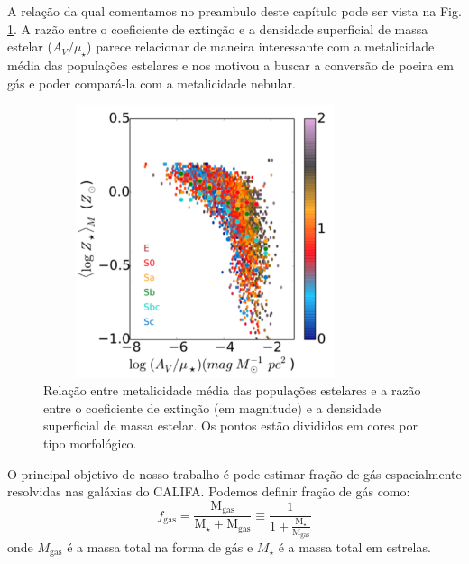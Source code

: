 A relação da qual comentamos no preambulo deste capítulo pode ser vista na Fig.
\ref{fig:dust2stars}. A razão entre o coeficiente de extinção e a densidade superficial de massa
estelar ($A_V / \mu_\star$) parece relacionar de maneira interessante com a metalicidade média das
populações estelares e nos motivou a buscar a conversão de poeira em gás e poder compará-la com a
metalicidade nebular.
\begin{figure}
	\centering
	\includegraphics[height = 8cm, width = 9.5cm]{figuras/dust2stars.pdf}
	\caption[$A_V / \mu_\star$ vs. ]
	{Relação entre metalicidade média das populações estelares e a razão entre o coeficiente de
extinção (em magnitude) e a densidade superficial de massa estelar. Os pontos estão divididos em
cores por tipo morfológico.}
	\label{fig:dust2stars}
\end{figure}
O principal objetivo de nosso trabalho é pode estimar fração de gás espacialmente resolvidas nas
galáxias do CALIFA. Podemos definir fração de gás como:
\begin{equation}
	f_{\mathrm{gas}} = \frac{\mathrm{M}_{\mathrm{gas}}}{\mathrm{M}_\star + \mathrm{M}_{\mathrm{gas}}}
	\equiv
\frac{1}{1 + \frac{\mathrm{M}_\star}{\mathrm{M}_{\mathrm{gas}}}}
	\label{eq:fgas}
\end{equation}
\noindent onde $M_{\mathrm{gas}}$ é a massa total na forma de gás e $M_\star$ é a massa total em
estrelas. 

